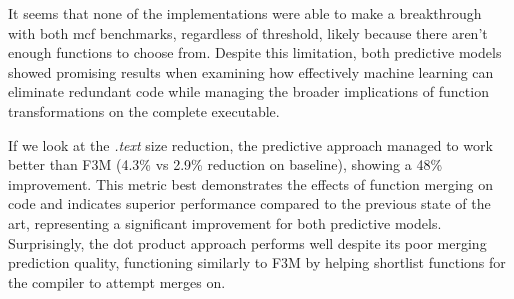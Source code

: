 




It seems that none of the implementations were able to make a breakthrough with both mcf benchmarks, regardless of threshold, likely because there aren't enough functions to choose from. Despite this limitation, both predictive models showed promising results when examining how effectively machine learning can eliminate redundant code while managing the broader implications of function transformations on the complete executable.

If we look at the \textit{.text} size reduction, the predictive approach managed to work better than F3M (4.3\% vs 2.9\% reduction on baseline), showing a 48\% improvement. This metric best demonstrates the effects of function merging on code and indicates superior performance compared to the previous state of the art, representing a significant improvement for both predictive models. Surprisingly, the dot product approach performs well despite its poor merging prediction quality, functioning similarly to F3M by helping shortlist functions for the compiler to attempt merges on.


